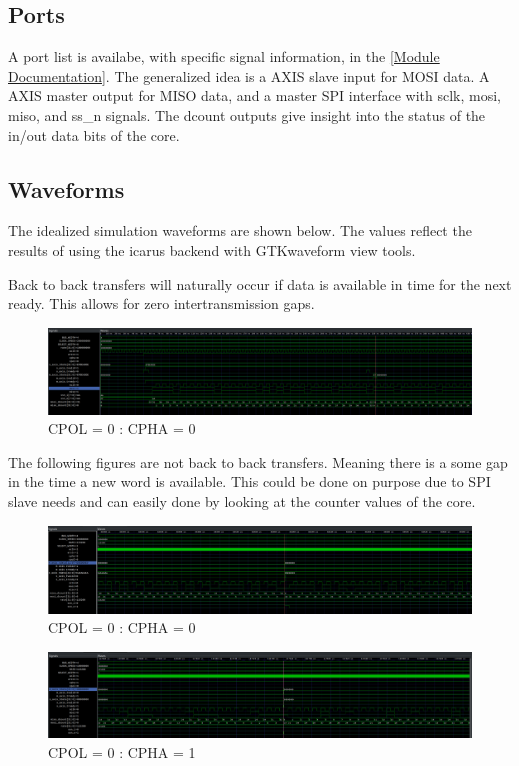 \subsection{Ports}
A port list is availabe, with specific signal information, in the \ref{Module Documentation}. The generalized idea is a AXIS slave input
for MOSI data. A AXIS master output for MISO data, and a master SPI interface with sclk, mosi, miso, and ss\_n signals. The dcount outputs
give insight into the status of the in/out data bits of the core.

\subsection{Waveforms}
The idealized simulation waveforms are shown below. The values reflect the results of using the icarus backend with GTKwaveform view tools.

\par
Back to back transfers will naturally occur if data is available in time for the next ready. This allows for zero intertransmission gaps.
\begin{figure}[H]
\caption{CPOL = 0 : CPHA = 0}
\centering
\includegraphics[width=\textwidth]{img/diagrams/waveform_00_back_to_back.png}
\end{figure}

\par
The following figures are not back to back transfers. Meaning there is a some gap in the time a new word is available. This could be done on purpose
due to SPI slave needs and can easily done by looking at the counter values of the core.
\begin{figure}[H]
\caption{CPOL = 0 : CPHA = 0}
\centering
\includegraphics[width=\textwidth]{img/diagrams/waveform_00_spaced.png}
\end{figure}

\begin{figure}[H]
\caption{CPOL = 0 : CPHA = 1}
\centering
\includegraphics[width=\textwidth]{img/diagrams/waveform_01_spaced.png}
\end{figure}

